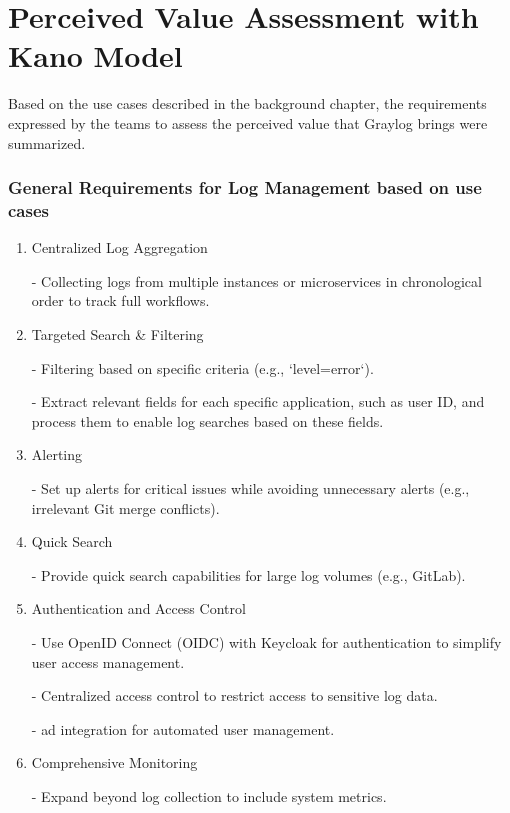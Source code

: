 \documentclass[../main.tex]{subfiles}
\begin{document}
\section{Perceived Value Assessment with Kano Model}

Based on the use cases described in the background chapter, the requirements expressed by the teams to assess the perceived value that Graylog brings were summarized.

\subsubsection{General Requirements for Log Management based on use cases}

\begin{enumerate}
    \item Centralized Log Aggregation

    - Collecting logs from multiple instances or microservices in chronological order to track full workflows.  

   \item Targeted Search \& Filtering
   
   - Filtering based on specific criteria (e.g., `level=error`).

   - Extract relevant fields for each specific application, such as user ID, and process them to enable log searches based on these fields.

   \item Alerting

   - Set up alerts for critical issues while avoiding unnecessary alerts (e.g., irrelevant Git merge conflicts).

   \item Quick Search

    - Provide quick search capabilities for large log volumes (e.g., GitLab).

   \item Authentication and Access Control

   - Use OpenID Connect (OIDC) with Keycloak for authentication to simplify user access management.
    
   - Centralized access control to restrict access to sensitive log data.
   
   - \gls{ad} integration for automated user management.

   \item Comprehensive Monitoring
   
   - Expand beyond log collection to include system metrics.  
   

\end{enumerate}
\end{document}
